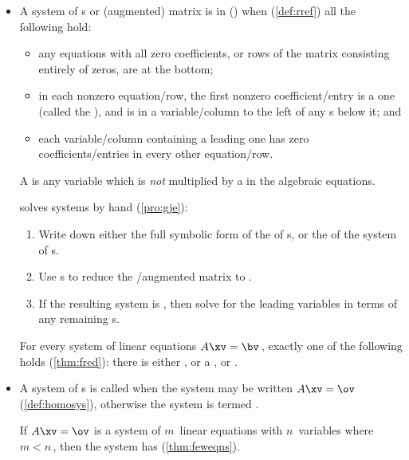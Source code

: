 \begin{itemize}
\item A system of s or (augmented) matrix is in  (\rref) when (\cref{def:rref}) all the following hold:
  \begin{itemize}
\item any equations with all zero coefficients, or rows of the matrix consisting entirely of zeros, are at the bottom; 
\item in each nonzero equation\slash row, the first nonzero coefficient\slash entry is a one (called the ), and is in a variable\slash column to the left of any s below it;
and
\item each variable\slash column containing a leading one has zero coefficients\slash entries in every other equation\slash row.\end{itemize}
A  is any variable which is \emph{not} multiplied by a  in the algebraic equations.

\itemme {} solves systems by hand (\cref{pro:gje}):
\begin{enumerate}
\item Write down either the full symbolic form of the  of s, or the  of the system of s.
\item Use s to reduce the \slash{augmented matrix} to .
\item If the resulting system is , then solve for the leading variables in terms of any remaining s.
\end{enumerate}

\itemhi For every system of linear equations \(A\xv=\bv\)\,, exactly one of the following holds (\cref{thm:fred}): there is either , or a , or .

\item A system of s is called  when the system may be written \(A\xv=\ov\) (\cref{def:homosys}),
otherwise the system is termed .

\itemme If \(A\xv=\ov\) is a  system of \(m\)~{linear equation}s with \(n\)~variables where \(m<n\)\,, then the system has  (\cref{thm:feweqns}).




\end{itemize}
